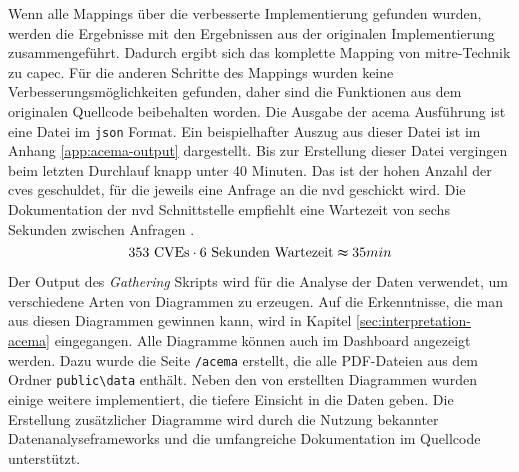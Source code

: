 Wenn alle Mappings über die verbesserte Implementierung gefunden wurden, werden die Ergebnisse mit den Ergebnissen aus der originalen Implementierung zusammengeführt. Dadurch ergibt sich das komplette Mapping von \gls{mitre}-Technik zu \gls{capec}. Für die anderen Schritte des Mappings wurden keine Verbesserungsmöglichkeiten gefunden, daher sind die Funktionen aus dem originalen Quellcode beibehalten worden. Die Ausgabe der \gls{acema} Ausführung ist eine Datei im \verb|json| Format. Ein beispielhafter Auszug aus dieser Datei ist im Anhang \ref{app:acema-output} dargestellt. Bis zur Erstellung dieser Datei vergingen beim letzten Durchlauf knapp unter 40 Minuten. Das ist der hohen Anzahl der \glspl{cve} geschuldet, für die jeweils eine Anfrage an die \gls{nvd} geschickt wird. Die Dokumentation der \gls{nvd} Schnittstelle empfiehlt eine Wartezeit von sechs Sekunden zwischen Anfragen \autocite{DevelopersStartHere}.
\[353 \text{ CVEs} \cdot 6 \text{ Sekunden Wartezeit} \thickapprox 35 min \]

Der Output des \textit{Gathering} Skripts wird für die Analyse der Daten verwendet, um verschiedene Arten von Diagrammen zu erzeugen. Auf die Erkenntnisse, die man aus diesen Diagrammen gewinnen kann, wird in Kapitel \ref{sec:interpretation-acema} eingegangen. Alle Diagramme können auch im Dashboard angezeigt werden. Dazu wurde die Seite \verb|/acema| erstellt, die alle PDF-Dateien aus dem Ordner \verb|public\data| enthält. Neben den von \citeauthor{klementSecuring6GTransition2024} erstellten Diagrammen wurden einige weitere implementiert, die tiefere Einsicht in die Daten geben. Die Erstellung zusätzlicher Diagramme wird durch die Nutzung bekannter Datenanalyseframeworks und die umfangreiche Dokumentation im Quellcode unterstützt.

